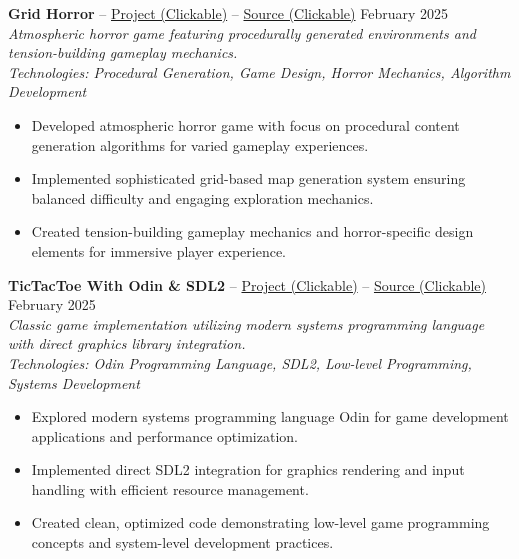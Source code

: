 \documentclass[a4paper,10pt]{article}
\begin{document}
\textbf{Grid Horror} -- \href{https://assayyaad.itch.io/grid-horror}{Project (Clickable)} -- \href{https://gitlab.com/Assayyaad/Grid-Horror}{Source (Clickable)} \hfill February 2025\\
\textit{Atmospheric horror game featuring procedurally generated environments and tension-building gameplay mechanics.}\\
\textit{Technologies: Procedural Generation, Game Design, Horror Mechanics, Algorithm Development}
\begin{itemize}[nosep]
    \item Developed atmospheric horror game with focus on procedural content generation algorithms for varied gameplay experiences.
    \item Implemented sophisticated grid-based map generation system ensuring balanced difficulty and engaging exploration mechanics.
    \item Created tension-building gameplay mechanics and horror-specific design elements for immersive player experience.
\end{itemize}

\addvspace{\medskipamount}

\textbf{TicTacToe With Odin \& SDL2} -- \href{https://assayyaad.itch.io/xo}{Project (Clickable)} -- \href{https://gitlab.com/Assayyaad/Lu3bat-XO}{Source (Clickable)} \hfill February 2025\\
\textit{Classic game implementation utilizing modern systems programming language with direct graphics library integration.}\\
\textit{Technologies: Odin Programming Language, SDL2, Low-level Programming, Systems Development}
\begin{itemize}[nosep]
    \item Explored modern systems programming language Odin for game development applications and performance optimization.
    \item Implemented direct SDL2 integration for graphics rendering and input handling with efficient resource management.
    \item Created clean, optimized code demonstrating low-level game programming concepts and system-level development practices.
\end{itemize}

\addvspace{\medskipamount}
\end{document}
